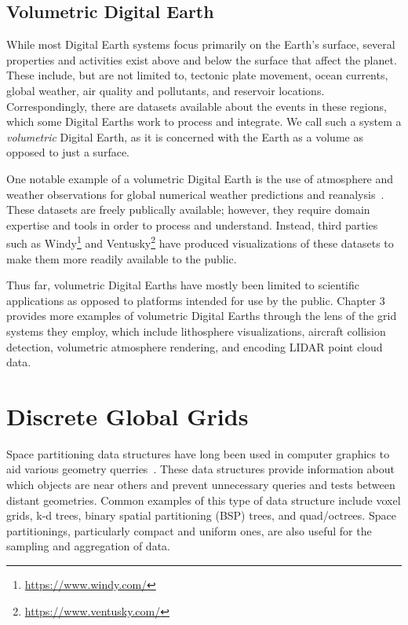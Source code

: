 \subsection{Volumetric Digital Earth} \label{chap:2:VDE}
While most Digital Earth systems focus primarily on the Earth's surface, several properties and activities exist above and below the surface that affect the planet.
These include, but are not limited to, tectonic plate movement, ocean currents, global weather, air quality and pollutants, and reservoir locations.
Correspondingly, there are datasets available about the events in these regions, which some Digital Earths work to process and integrate.
We call such a system a \textit{volumetric} Digital Earth, as it is concerned with the Earth as a volume as opposed to just a surface.


One notable example of a volumetric Digital Earth is the use of atmosphere and weather observations for global numerical weather predictions and reanalysis~\cite{ncepncar, era5}.
These datasets are freely publically available; however, they require domain expertise and tools in order to process and understand.
Instead, third parties such as Windy\footnote{\url{https://www.windy.com/}} and Ventusky\footnote{\url{https://www.ventusky.com/}} have produced visualizations of these datasets to make them more readily available to the public.


Thus far, volumetric Digital Earths have mostly been limited to scientific applications as opposed to platforms intended for use by the public.
Chapter 3 provides more examples of volumetric Digital Earths through the lens of the grid systems they employ, which include lithosphere visualizations, aircraft collision detection, volumetric atmosphere rendering, and encoding LIDAR point cloud data.


\section{Discrete Global Grids} \label{chap:2:DGG}
Space partitioning data structures have long been used in computer graphics to aid various geometry querries~\cite{samet1990design}.
These data structures provide information about which objects are near others and prevent unnecessary queries and tests between distant geometries.
Common examples of this type of data structure include voxel grids, k-d trees, binary spatial partitioning (BSP) trees, and quad/octrees.
Space partitionings, particularly compact and uniform ones, are also useful for the sampling and aggregation of data. 


